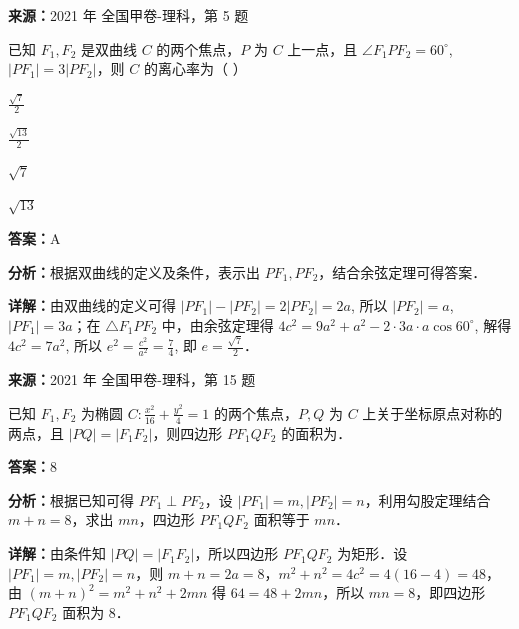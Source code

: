 \begin{question}[points=5]
\textbf{来源：}2021 年 全国甲卷-理科，第 5 题\par
已知 $F_1, F_2$ 是双曲线 $C$ 的两个焦点，$P$ 为 $C$ 上一点，且 $\angle F_1PF_2 = 60^\circ$, $|PF_1| = 3|PF_2|$，则 $C$ 的离心率为（ ）
\begin{choices}
  \item $\frac{\sqrt{7}}{2}$
  \item $\frac{\sqrt{13}}{2}$
  \item $\sqrt{7}$
  \item $\sqrt{13}$
\end{choices}
\begin{solution}
\textbf{答案：}A

\textbf{分析：}根据双曲线的定义及条件，表示出 $PF_1, PF_2$，结合余弦定理可得答案．

\textbf{详解：}由双曲线的定义可得 $|PF_1|-|PF_2| = 2|PF_2| = 2a$, 所以 $|PF_2| = a$, $|PF_1| = 3a$；在 $\triangle F_1PF_2$ 中，由余弦定理得 $4c^2 = 9a^2 + a^2 - 2\cdot 3a\cdot a\cos60^\circ$, 解得 $4c^2 = 7a^2$, 所以 $e^2 = \frac{c^2}{a^2} = \frac{7}{4}$, 即 $e = \frac{\sqrt{7}}{2}$．
\end{solution}
\end{question}

\begin{question}[points=5]
\textbf{来源：}2021 年 全国甲卷-理科，第 15 题\par
已知 $F_1, F_2$ 为椭圆 $C: \frac{x^2}{16} + \frac{y^2}{4} = 1$ 的两个焦点，$P, Q$ 为 $C$ 上关于坐标原点对称的两点，且 $|PQ| = |F_1F_2|$，则四边形 $PF_1QF_2$ 的面积为．
\fillin[{$8$}]
\begin{solution}
\textbf{答案：}$8$

\textbf{分析：}根据已知可得 $PF_1 \perp PF_2$，设 $|PF_1| = m, |PF_2| = n$，利用勾股定理结合 $m+n=8$，求出 $mn$，四边形 $PF_1QF_2$ 面积等于 $mn$．

\textbf{详解：}由条件知 $|PQ| = |F_1F_2|$，所以四边形 $PF_1QF_2$ 为矩形．设 $|PF_1| = m, |PF_2| = n$，则 $m+n = 2a = 8$，$m^2+n^2 = 4c^2 = 4(16-4) = 48$，由 $(m+n)^2 = m^2+n^2+2mn$ 得 $64 = 48+2mn$，所以 $mn = 8$，即四边形 $PF_1QF_2$ 面积为 $8$．
\end{solution}
\end{question}


